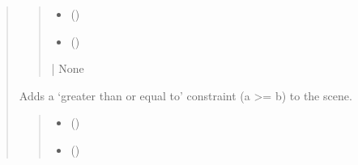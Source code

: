 \documentclass[letterpaper,10pt,english]{sphinxmanual}
\begin{document}
\begin{quote}
\begin{fulllineitems}
\begin{fulllineitems}
\begin{quote}
\begin{description}
\begin{itemize}
\item {} 
\sphinxAtStartPar
{} (\sphinxstyleliteralemphasis{\sphinxupquote{ | }}\sphinxstyleliteralemphasis{\sphinxupquote{ | }})

\item {} 
\sphinxAtStartPar
{} (\sphinxstyleliteralemphasis{\sphinxupquote{ | }})

\end{itemize}

\sphinxAtStartPar
{} | None

\end{description}\end{quote}

\end{fulllineitems}


\begin{fulllineitems}
\label{\detokenize{pygeox:pygeox.constraint.ConstraintNamespace.geq}}
\pysigstartsignatures
\pysiglinewithargsret
{}
{\sphinxparamcomma {}\sphinxparamcomma {}}
{}
\pysigstopsignatures
\sphinxAtStartPar
Adds a ‘greater than or equal to’ constraint (a \textgreater{}= b) to the scene.
\begin{quote}\begin{description}
\begin{itemize}
\item {} 
\sphinxAtStartPar
{} (\sphinxstyleliteralemphasis{\sphinxupquote{ | }}\sphinxstyleliteralemphasis{\sphinxupquote{ | }})

\item {} 
\sphinxAtStartPar
{} (\sphinxstyleliteralemphasis{\sphinxupquote{ | }}\sphinxstyleliteralemphasis{\sphinxupquote{ | }})


\end{itemize}
\end{description}
\end{quote}
\end{fulllineitems}
\end{fulllineitems}
\end{quote}
\end{document}
